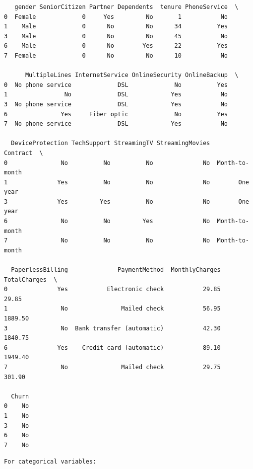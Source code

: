\documentclass[8pt,onecolumn,aps,pra]{revtex4-1}
\begin{document}
    
    \begin{verbatim}
   gender SeniorCitizen Partner Dependents  tenure PhoneService  \
0  Female             0     Yes         No       1           No   
1    Male             0      No         No      34          Yes   
3    Male             0      No         No      45           No   
6    Male             0      No        Yes      22          Yes   
7  Female             0      No         No      10           No   

      MultipleLines InternetService OnlineSecurity OnlineBackup  \
0  No phone service             DSL             No          Yes   
1                No             DSL            Yes           No   
3  No phone service             DSL            Yes           No   
6               Yes     Fiber optic             No          Yes   
7  No phone service             DSL            Yes           No   

  DeviceProtection TechSupport StreamingTV StreamingMovies        Contract  \
0               No          No          No              No  Month-to-month   
1              Yes          No          No              No        One year   
3              Yes         Yes          No              No        One year   
6               No          No         Yes              No  Month-to-month   
7               No          No          No              No  Month-to-month   

  PaperlessBilling              PaymentMethod  MonthlyCharges  TotalCharges  \
0              Yes           Electronic check           29.85         29.85   
1               No               Mailed check           56.95       1889.50   
3               No  Bank transfer (automatic)           42.30       1840.75   
6              Yes    Credit card (automatic)           89.10       1949.40   
7               No               Mailed check           29.75        301.90   

  Churn  
0    No  
1    No  
3    No  
6    No  
7    No  
    \end{verbatim}

    
    \begin{Verbatim}[commandchars=\\\{\}]
For categorical variables:

    \end{Verbatim}
\end{document}
